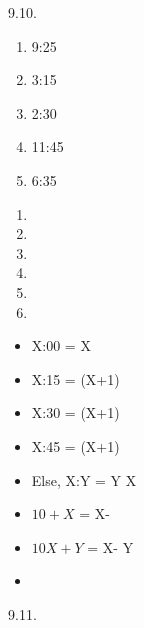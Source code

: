 \begin{refsection}
\begin{practiceproblemsolution}{9.10. \langnameEstonian}
\begin{solutions}[label=Solution 9.10\alph*]
    \item
    \begin{multicols}{5}
        \begin{enumerate}[label = \alph*.]
            \item 9:25
            \item 3:15
            \item 2:30
            \item 11:45
            \item 6:35
        \end{enumerate}
    \end{multicols}
    \item
    \begin{multicols}{2}
        \begin{enumerate}[label = \alph*., start = 6]
            \item {}
            \item {}
            \item {}
            \item {}
            \item {}
            \item[]
        \end{enumerate}
    \end{multicols}
\end{solutions}

 \quad
\begin{multicols}{2}
    \begin{itemize}
        \item X:00 =  X
        \item X:15 =  (X+1)
        \item X:30 =  (X+1)
        \item X:45 =  (X+1)
        \item Else, X:Y = Y  X 
        \item $10+X$ = X-
        \item $10X+Y$ = X- Y
        \item[]
		\end{itemize}
\end{multicols}

\end{practiceproblemsolution}
\pagebreak
\begin{practiceproblemsolution}{9.11. \langnameWaorani}


\end{practiceproblemsolution}
\end{refsection}
